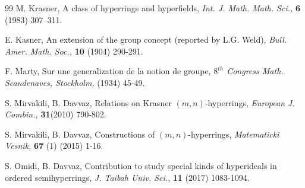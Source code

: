 \documentclass[preprint,review,10pt]{amsart}
\theoremstyle{definition}
\theoremstyle{remark}
\numberwithin{equation}{section}
\begin{document}
\begin{thebibliography}{99}
M. Krasner,  A class of hyperrings and hyperﬁelds, {\it Int. J. Math. Math. Sci.,}  {\bf 6} (1983) 307–311.


E. Kasner, An extension of the group concept (reported by L.G. Weld), {\it Bull. Amer. Math. Soc.,} {\bf 10} (1904) 290-291.





 
 
 



F. Marty, Sur une generalization de la notion de groupe, {\it $8^{th}$ Congress Math. Scandenaves, Stockholm,} (1934) 45-49.




S. Mirvakili, B. Davvaz, Relations on Krasner $(m,n)$-hyperrings, {\it European J. Combin.,} {\bf 31}(2010) 790-802.

S. Mirvakili, B. Davvaz, Constructions of  $(m,n)$-hyperrings, {\it Matematicki Vesnik,} {\bf 67} (1) (2015) 1-16.



S. Omidi, B. Davvaz, Contribution to study special kinds of hyperideals in ordered semihyperrings, {\it J. Taibah Univ. Sci.}, {\bf 11} (2017) 1083-1094.





\end{thebibliography}
\end{document}
